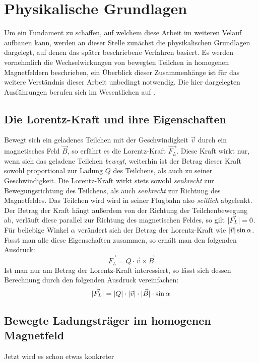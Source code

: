 \chapter{Physikalische Grundlagen}

Um ein Fundament zu schaffen, auf welchem diese Arbeit im weiteren Velauf aufbauen kann, werden
an dieser Stelle zun\"achst die physikalischen Grundlagen dargelegt, auf denen das sp\"ater beschriebene
Verfahren basiert. Es werden vornehmlich die Wechselwirkungen von bewegten Teilchen in homogenen
Magnetfeldern beschrieben, ein \"Uberblick dieser Zusammenh\"ange ist f\"ur das weitere Verst\"andnis
dieser Arbeit unbedingt notwendig. Die hier dargelegten Ausf\"uhrungen berufen sich im Wesentlichen auf \cite{Vog99}.

\section{Die Lorentz-Kraft und ihre Eigenschaften}

Bewegt sich ein geladenes Teilchen mit der Geschwindigkeit \(\vec{v}\) durch ein magnetisches Feld \(\vec{B}\),
so erf\"ahrt es die Lorentz-Kraft \(\vec{F_L}\). Diese Kraft wirkt nur, wenn sich das geladene Teilchen \textit{bewegt}, weiterhin
ist der Betrag dieser Kraft sowohl proportional zur Ladung \(Q\) des Teilchens, als auch zu seiner Geschwindigkeit.
Die Lorentz-Kraft wirkt stets sowohl \textit{senkrecht} zur Bewegungsrichtung des Teilchens, als auch \textit{senkrecht} zur Richtung
des Magnetfeldes. Das Teilchen wird wird in seiner Flugbahn also
\textit{seitlich} abgelenkt. Der Betrag der Kraft h\"angt au{\ss}erdem von der Richtung der Teilchenbewegung ab, verl\"auft diese
parallel zur Richtung des magnetischen Feldes, so gilt \(\lvert\vec{F_L}\rvert = 0\). F\"ur beliebige Winkel \(\alpha\) ver\"andert
sich der Betrag der Lorentz-Kraft wie \(\lvert\vec{v}\rvert\sin{\alpha}\).
Fasst man alle diese Eigenschaften zusammen, so erh\"alt man den folgenden Ausdruck:
\begin{equation}
  \vec{F_L} = Q \cdot \vec{v} \times \vec{B}
\end{equation}
Ist man nur am Betrag der Lorentz-Kraft interessiert, so l\"asst sich dessen Berechnung durch den folgenden Ausdruck vereinfachen:
\begin{equation}
  \lvert\vec{F_L}\rvert = \lvert Q\rvert \cdot \lvert\vec{v}\rvert \cdot \lvert\vec{B}\rvert \cdot \sin{\alpha}
\end{equation}

\section{Bewegte Ladungstr\"ager im homogenen Magnetfeld}

Jetzt wird es schon etwas konkreter
